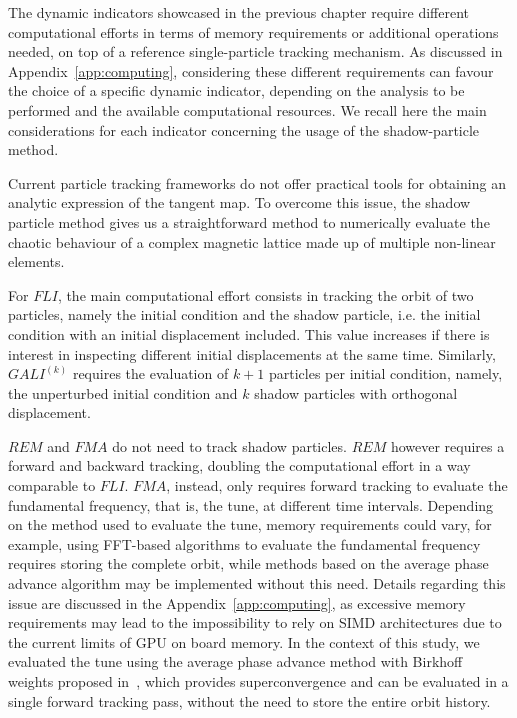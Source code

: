 The dynamic indicators showcased in the previous chapter require different computational efforts in terms of memory requirements or additional operations needed, on top of a reference single-particle tracking mechanism. As discussed in Appendix~\ref{app:computing}, considering these different requirements can favour the choice of a specific dynamic indicator, depending on the analysis to be performed and the available computational resources. We recall here the main considerations for each indicator concerning the usage of the shadow-particle method.

Current particle tracking frameworks do not offer practical tools for obtaining an analytic expression of the tangent map. To overcome this issue, the shadow particle method gives us a straightforward method to numerically evaluate the chaotic behaviour of a complex magnetic lattice made up of multiple non-linear elements.

For $FLI$, the main computational effort consists in tracking the orbit of two particles, namely the initial condition and the shadow particle, i.e. the initial condition with an initial displacement included. This value increases if there is interest in inspecting different initial displacements at the same time. Similarly, $GALI^{(k)}$ requires the evaluation of $k+1$ particles per initial condition, namely, the unperturbed initial condition and $k$ shadow particles with orthogonal displacement.

$REM$ and $FMA$ do not need to track shadow particles. $REM$ however requires a forward and backward tracking, doubling the computational effort in a way comparable to $FLI$. $FMA$, instead, only requires forward tracking to evaluate the fundamental frequency, that is, the tune, at different time intervals. Depending on the method used to evaluate the tune, memory requirements could vary, for example, using FFT-based algorithms to evaluate the fundamental frequency requires storing the complete orbit, while methods based on the average phase advance algorithm may be implemented without this need. Details regarding this issue are discussed in the Appendix~\ref{app:computing}, as excessive memory requirements may lead to the impossibility to rely on SIMD architectures due to the current limits of GPU on board memory. In the context of this study, we evaluated the tune using the average phase advance method with Birkhoff weights proposed in~\cite{russo:ipac2021-thpab189}, which provides superconvergence and can be evaluated in a single forward tracking pass, without the need to store the entire orbit history.

